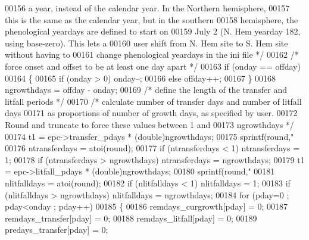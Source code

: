 \begin{DoxyCode}
00156 \textcolor{comment}{                a year, instead of the calendar year. In the Northern hemisphere,}
00157 \textcolor{comment}{                this is the same as the calendar year, but in the southern}
00158 \textcolor{comment}{                hemisphere, the phenological yeardays are defined to start on}
00159 \textcolor{comment}{                July 2 (N. Hem yearday 182, using base-zero).  This lets a}
00160 \textcolor{comment}{                user shift from N. Hem site to S. Hem site without having to}
00161 \textcolor{comment}{                change phenological yeardays in the ini file */}
00162                 \textcolor{comment}{/* force onset and offset to be at least one day apart */}
00163                 \textcolor{keywordflow}{if} (onday == offday)
00164                 \{
00165                     \textcolor{keywordflow}{if} (onday > 0) onday--;
00166                     \textcolor{keywordflow}{else} offday++;
00167                 \}
00168                 ngrowthdays = offday - onday;
00169                 \textcolor{comment}{/* define the length of the transfer and litfall periods */}
00170                 \textcolor{comment}{/* calculate number of transfer days and number of litfall days}
00171 \textcolor{comment}{                as proportions of number of growth days, as specified by user.}
00172 \textcolor{comment}{                Round and truncate to force these values between 1 and }
00173 \textcolor{comment}{                ngrowthdays */}
00174                 t1 = epc->transfer\_pdays * (double)ngrowthdays;
00175                 sprintf(round,\textcolor{stringliteral}{"%
00176                 ntransferdays = atoi(round);
00177                 \textcolor{keywordflow}{if} (ntransferdays < 1) ntransferdays = 1;
00178                 \textcolor{keywordflow}{if} (ntransferdays > ngrowthdays) ntransferdays = ngrowthdays;
00179                 t1 = epc->litfall\_pdays * (double)ngrowthdays;
00180                 sprintf(round,\textcolor{stringliteral}{"%
00181                 nlitfalldays = atoi(round);
00182                 \textcolor{keywordflow}{if} (nlitfalldays < 1) nlitfalldays = 1;
00183                 \textcolor{keywordflow}{if} (nlitfalldays > ngrowthdays) nlitfalldays = ngrowthdays;
00184                 \textcolor{keywordflow}{for} (pday=0 ; pday<onday ; pday++)
00185                 \{
00186                     remdays\_curgrowth[pday] = 0;
00187                     remdays\_transfer[pday] = 0;
00188                     remdays\_litfall[pday] = 0;
00189                     predays\_transfer[pday] = 0;
}}
\end{DoxyCode}
